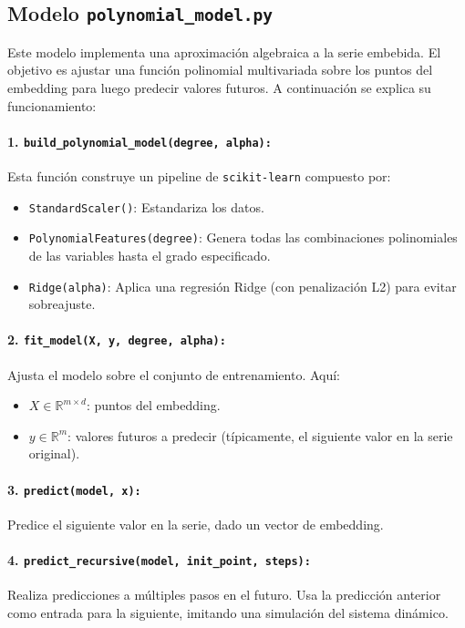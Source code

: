 \subsection*{Modelo \texttt{polynomial\_model.py}}

Este modelo implementa una aproximación algebraica a la serie embebida. El objetivo es ajustar una función polinomial multivariada sobre los puntos del embedding para luego predecir valores futuros. A continuación se explica su funcionamiento:

\paragraph{1. \texttt{build\_polynomial\_model(degree, alpha):}} Esta función construye un pipeline de \texttt{scikit-learn} compuesto por:

\begin{itemize}
    \item \texttt{StandardScaler()}: Estandariza los datos.
    \item \texttt{PolynomialFeatures(degree)}: Genera todas las combinaciones polinomiales de las variables hasta el grado especificado.
    \item \texttt{Ridge(alpha)}: Aplica una regresión Ridge (con penalización L2) para evitar sobreajuste.
\end{itemize}

\paragraph{2. \texttt{fit\_model(X, y, degree, alpha):}} Ajusta el modelo sobre el conjunto de entrenamiento. Aquí:
\begin{itemize}
    \item \( X \in \mathbb{R}^{m \times d} \): puntos del embedding.
    \item \( y \in \mathbb{R}^m \): valores futuros a predecir (típicamente, el siguiente valor en la serie original).
\end{itemize}

\paragraph{3. \texttt{predict(model, x):}} Predice el siguiente valor en la serie, dado un vector de embedding.

\paragraph{4. \texttt{predict\_recursive(model, init\_point, steps):}} Realiza predicciones a múltiples pasos en el futuro. Usa la predicción anterior como entrada para la siguiente, imitando una simulación del sistema dinámico.

